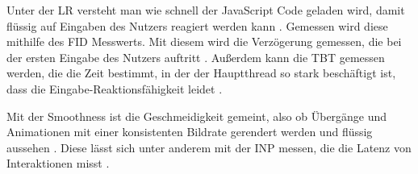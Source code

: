 Unter der \ac{LR} versteht man wie schnell der JavaScript Code geladen wird, damit flüssig auf Eingaben des Nutzers reagiert werden kann \cite{PerformanceMetrics}. Gemessen wird diese mithilfe des \ac{FID} Messwerts. Mit diesem wird die Verzögerung gemessen, die bei der ersten Eingabe des Nutzers auftritt \cite{FID}. Außerdem kann die \ac{TBT} gemessen werden, die die Zeit bestimmt, in der der Hauptthread so stark beschäftigt ist, dass die Eingabe-Reaktionsfähigkeit leidet \cite{TBT}.

Mit der Smoothness ist die Geschmeidigkeit gemeint, also ob Übergänge und Animationen mit einer konsistenten Bildrate gerendert werden und flüssig aussehen \cite{PerformanceMetrics}. Diese lässt sich unter anderem mit der \ac{INP} messen, die die Latenz von Interaktionen misst \cite{INP}.
